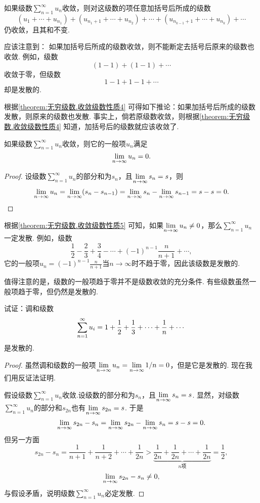 \begin{property}\label{theorem:无穷级数.收敛级数性质4}
如果级数\(\sum\limits_{n=1}^\infty u_n\)收敛，则对这级数的项任意加括号后所成的级数\[
(u_1+\dotsb+u_{n_1}) + (u_{n_1+1}+\dotsb+u_{n_2}) + \dotsb + (u_{n_{k-1}+1}+\dotsb+u_{n_k}) + \dotsb
\]仍收敛，且其和不变.
\end{property}

应该注意到：
如果加括号后所成的级数收敛，则不能断定去括号后原来的级数也收敛.
例如，级数\[
(1-1)+(1-1)+\dotsb
\]收敛于零，但级数\[
1-1+1-1+\dotsb
\]却是发散的.

根据\cref{theorem:无穷级数.收敛级数性质4} 可得如下推论：{\color{red}如果加括号后所成的级数发散，则原来的级数也发散.}
事实上，倘若原级数收敛，则根据\cref{theorem:无穷级数.收敛级数性质4} 知道，加括号后的级数就应该收敛了.

\begin{property}[级数收敛的必要条件]\label{theorem:无穷级数.收敛级数性质5}
如果级数\(\sum\limits_{n=1}^\infty u_n\)收敛，则它的一般项\(u_n\)满足\[
\lim\limits_{n\to\infty} u_n = 0.
\]
\begin{proof}
设级数\(\sum\limits_{n=1}^\infty u_n\)的部分和为\(s_n\)，且\(\lim\limits_{n\to\infty} s_n = s\)，则\[
\lim\limits_{n\to\infty} u_n = \lim\limits_{n\to\infty}(s_n - s_{n-1}) = \lim\limits_{n\to\infty} s_n - \lim\limits_{n\to\infty} s_{n-1} = s - s = 0.
\qedhere
\]
\end{proof}
\end{property}

根据\cref{theorem:无穷级数.收敛级数性质5} 可知，如果\(\lim\limits_{n\to\infty} u_n \neq 0\)，那么\(\sum\limits_{n=1}^\infty u_n\)一定发散.
例如，级数\[
\frac{1}{2}-\frac{2}{3}+\frac{3}{4}-\dotsb+(-1)^{n-1}\frac{n}{n+1}+\dotsb,
\]它的一般项\(u_n = (-1)^{n-1} \frac{n}{n+1}\)当\(n\to\infty\)时不趋于零，因此该级数是发散的.

值得注意的是，级数的一般项趋于零并不是级数收敛的充分条件.
有些级数虽然一般项趋于零，但仍然是发散的.
\begin{example}\label{example:无穷级数.调和级数的收敛性}
试证：调和级数\[
\sum\limits_{n=1}^\infty u_i = 1+\frac{1}{2}+\frac{1}{3}+\dotsb+\frac{1}{n}+\dotsb
\]是发散的.
\begin{proof}
虽然调和级数的一般项\(\lim\limits_{n\to\infty} u_n = \lim\limits_{n\to\infty} 1/n = 0\)，但是它是发散的.
现在我们用反证法证明.

假设级数\(\sum\limits_{n=1}^\infty u_n\)收敛.设级数的部分和为\(s_n\)，且\(\lim\limits_{n\to\infty} s_n = s\).
显然，对级数\(\sum\limits_{n=1}^\infty u_n\)的部分和\(s_{2n}\)也有\(\lim\limits_{n\to\infty} s_{2n} = s\).
于是\[
\lim\limits_{n\to\infty} {s_{2n}-s_n} = \lim\limits_{n\to\infty} s_{2n} - \lim\limits_{n\to\infty} s_n = s - s = 0.
\]但另一方面\[
s_{2n} - s_n = \frac{1}{n+1}+\frac{1}{n+2}+\dotsb+\frac{1}{2n}
> \underbrace{\frac{1}{2n}+\frac{1}{2n}+\dotsb+\frac{1}{2n}}_{n\text{项}}
= \frac{1}{2},
\]\[
\lim\limits_{n\to\infty} {s_{2n}-s_n} \neq 0,
\]与假设矛盾，说明级数\(\sum\limits_{n=1}^\infty u_n\)必定发散.
\end{proof}
\end{example}

